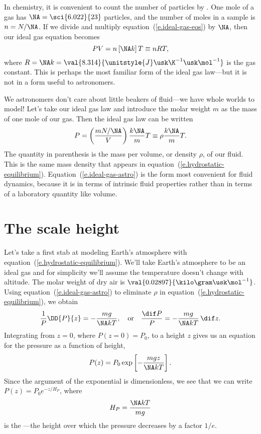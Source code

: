 In chemistry, it is convenient to count the number of particles by .  One mole of a gas has $\NA = \sci{6.022}{23}$ particles, and the number of moles in a sample is $n = N/\NA$.  If we divide and multiply equation~(\ref{e.ideal-gas-eos}) by $\NA$, then our ideal gas equation becomes
\[ PV = n\left[\NA k\right]T \equiv n R T, \]
where $R = \NA k = \val{8.314}{\unitstyle{J}\usk\K^{-1}\usk\mol^{-1}}$ is the gas constant. This is perhaps the most familiar form of the ideal gas law---but it is not in a form useful to astronomers.

We astronomers don't care about little beakers of fluid---we have whole worlds to model! Let's take our ideal gas law and introduce the molar weight $m$ as the mass of one mole of our gas.  Then the ideal gas law can be written
\begin{equation}\label{e.ideal-gas-astro}
 P = \left(\frac{mN/\NA}{V}\right)\frac{k\NA}{m} T \equiv \rho \frac{k\NA}{m} T.
\end{equation}
The quantity in parenthesis is the mass per volume, or density $\rho$, of our fluid.  This is the same mass density that appears in equation~(\ref{e.hydrostatic-equilibrium}).  Equation~(\ref{e.ideal-gas-astro}) is the form most convenient for fluid dynamics, because it is in terms of intrinsic fluid properties rather than in terms of a laboratory quantity like volume.

\section{The scale height}\label{s.scale-height}
Let's take a first stab at modeling Earth's atmosphere with equation~(\ref{e.hydrostatic-equilibrium}). We'll take Earth's atmosphere to be an ideal gas and for simplicity we'll assume the temperature doesn't change with altitude.  The molar weight of dry air is $\val{0.02897}{\kilo\gram\usk\mol^{-1}}$.  Using equation~(\ref{e.ideal-gas-astro}) to eliminate $\rho$ in equation~(\ref{e.hydrostatic-equilibrium}), we obtain
\[
	\frac{1}{P}\DD{P}{z} = -\frac{mg}{\NA kT},\quad\textrm{or} \quad\frac{\dif P}{P} = -\frac{mg}{\NA kT}\,\dif z.
\]
Integrating from $z=0$, where $P(z=0)=P_{0}$, to a height $z$ gives us an equation for the pressure as a function of height,
\begin{equation}\label{e.exp-atm}
	P(z) = P_{0}\exp\left[-\frac{mgz}{\NA kT}\right].
\end{equation}
Since the argument of the exponential is dimensionless, we see that we can write $P(z) = P_{0}e^{-z/H_{P}}$, where
\[  H_{P} = \frac{\NA kT}{mg} \]
is the ---the height over which the pressure decreases by a factor $1/e$.

